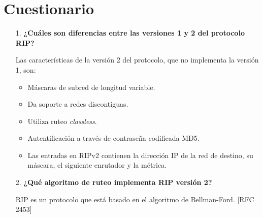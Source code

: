\documentclass{article}
\begin{document}
\section{Cuestionario}

\begin{itemize}
\item[1.] \textbf{¿Cuáles son diferencias entre las versiones 1 y 2 del protocolo RIP?}

Las características de la versión 2 del protocolo, que no implementa la versión 1, son:
\begin{itemize}
\item Máscaras de subred de longitud variable.
\item Da soporte a redes discontiguas.
\item Utiliza ruteo \textit{classless}.
\item Autentificación a través de contraseña codificada MD5.
\item Las entradas en RIPv2 contienen la dirección IP de la red de destino, su máscara, el siguiente enrutador y la métrica.
\end{itemize}

\item[2.] \textbf{¿Qué algoritmo de ruteo implementa RIP versión 2?}

RIP es un protocolo que está basado en el algoritmo de Bellman-Ford. [RFC 2453]

\end{itemize}
\end{document}
